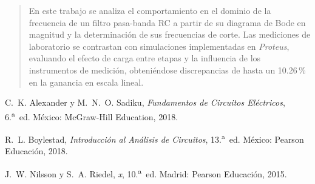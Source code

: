 \documentclass[twocolumn]{article}
\begin{document}
\begin{abstract}
  En este trabajo se analiza el comportamiento en el dominio de la frecuencia de un filtro pasa-banda RC a partir de su diagrama de Bode en magnitud y la determinación de sus frecuencias de corte. Las mediciones de laboratorio se contrastan con simulaciones implementadas en \textit{Proteus}, evaluando el efecto de carga entre etapas y la influencia de los instrumentos de medición, obteniéndose discrepancias de hasta un 10.26\,\% en la ganancia en escala lineal.

\end{abstract}





\begin{thebibliography}{99}

C.~K. Alexander y M.~N.~O. Sadiku, \emph{Fundamentos de Circuitos Eléctricos}, 6.\textsuperscript{a}~ed. México: McGraw-Hill Education, 2018.

R.~L. Boylestad, \emph{Introducción al Análisis de Circuitos}, 13.\textsuperscript{a}~ed. México: Pearson Educación, 2018.

J.~W. Nilsson y S.~A. Riedel, \emph{x}, 10.\textsuperscript{a}~ed. Madrid: Pearson Educación, 2015.

\end{thebibliography}

\end{document}
